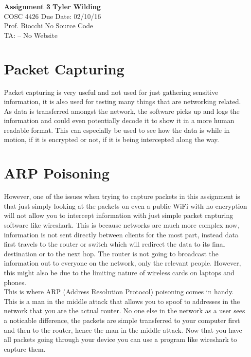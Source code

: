 \documentclass[a4paper, 11pt]{article}
\begin{document}
\noindent
\large\textbf{Assignment 3} \hfill \textbf{Tyler Wilding} \\
\normalsize COSC 4426 \hfill Due Date: 02/10/16 \\
Prof. Biocchi \hfill No Source Code \\
TA: -- \hfill No Website

\section*{Packet Capturing}
Packet capturing is very useful and not used for just gathering sensitive information, it is also used for testing many things that are networking related.  As data is transferred amongst the network, the software picks up and logs the information and could even potentially decode it to show it in a more human readable format.  This can especially be used to see how the data is while in motion, if it is encrypted or not, if it is being intercepted along the way.

\section*{ARP Poisoning}
However, one of the issues when trying to capture packets in this assignment is that just simply looking at the packets on even a public WiFi with no encryption will not allow you to intercept information with just simple packet capturing software like wireshark.  This is because networks are much more complex now, information is not sent directly between clients for the most part, instead data first travels to the router or switch which will redirect the data to its final destination or to the next hop.  The router is not going to broadcast the information out to everyone on the network, only the relevant people.  However, this might also be due to the limiting nature of wireless cards on laptops and phones.\\

This is where ARP (Address Resolution Protocol) poisoning comes in handy.  This is a man in the middle attack that allows you to spoof to addresses in the network that you are the actual router.  No one else in the network as a user sees a noticable difference, the packets are simple transferred to your computer first and then to the router, hence the man in the middle attack.  Now that you have all packets going through your device you can use a program like wireshark to capture them.\\
\end{document}
